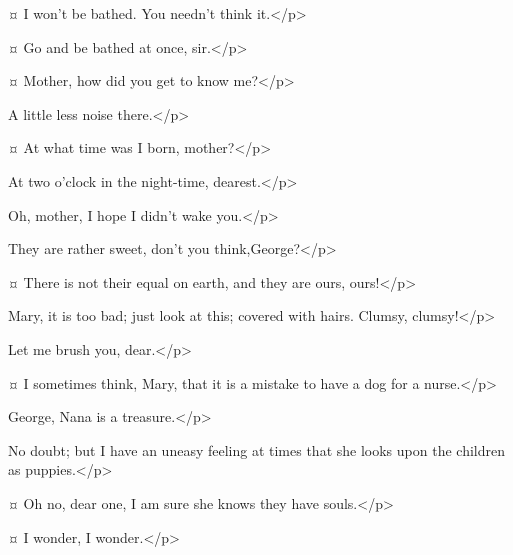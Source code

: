 \johnspeaks {}¤
I won't be bathed.
You needn't think it.</p>

\mrdarlingspeaks {}¤
Go and be bathed at once, sir.</p>


\michaelspeaks {}¤
Mother, how did you get to know me?</p>

\mrdarlingspeaks
A little less noise there.</p>

\michaelspeaks {}¤
At what time was I born, mother?</p>

\mrsdarlingspeaks
At two o'clock in the night-time, dearest.</p>

\michaelspeaks
Oh, mother, I hope I didn't wake you.</p>

\mrsdarlingspeaks
They are rather sweet, don't you think,George?</p>

\mrdarlingspeaks {}¤
There is not their equal on earth, and they are ours, ours!</p>


\mrdarlingspeaks
Mary, it is too bad; just look at this; covered with hairs.
Clumsy, clumsy!</p>


\mrsdarlingspeaks
Let me brush you, dear.</p>


\mrdarlingspeaks {}¤
I sometimes think, Mary, that it is a mistake to have a dog for a nurse.</p>

\mrsdarlingspeaks
George, Nana is a treasure.</p>

\mrdarlingspeaks
No doubt; but I have an uneasy feeling at times that she looks upon the children as puppies.</p>

\mrsdarlingspeaks {}¤
Oh no, dear one, I am sure she knows they have souls.</p>

\mrdarlingspeaks {}¤
I wonder, I wonder.</p>


